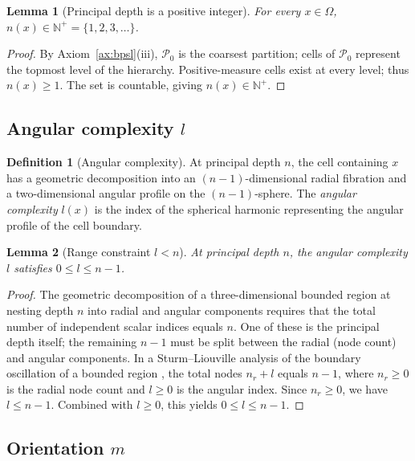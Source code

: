 \documentclass[11pt,twocolumn,a4paper]{article}
\theoremstyle{axiomstyle}
\theoremstyle{conseqstyle}
\newtheorem{lemma}{Lemma}
\theoremstyle{definition}
\newtheorem{definition}{Definition}
\theoremstyle{remark}
\newcommand{\Partition}{\mathcal{P}}
\newcommand{\Natural}{\mathbb{N}}
\begin{document}
\begin{lemma}[Principal depth is a positive integer]
\label{lem:nispositive}
For every $x\in\Omega$, $n(x)\in\Natural^{+}=\{1,2,3,\ldots\}$.
\end{lemma}
\begin{proof}
By Axiom~\ref{ax:bpsl}(iii), $\Partition_{0}$ is the coarsest partition; cells of $\Partition_{0}$ represent the topmost level of the hierarchy. Positive-measure cells exist at every level; thus $n(x)\ge 1$. The set is countable, giving $n(x)\in\Natural^{+}$.
\end{proof}

\subsection{Angular complexity $l$}

\begin{definition}[Angular complexity]
\label{def:angular}
At principal depth $n$, the cell containing $x$ has a geometric decomposition into an $(n-1)$-dimensional radial fibration and a two-dimensional angular profile on the $(n-1)$-sphere. The \emph{angular complexity} $l(x)$ is the index of the spherical harmonic representing the angular profile of the cell boundary.
\end{definition}

\begin{lemma}[Range constraint $l<n$]
\label{lem:langeconstraint}
At principal depth $n$, the angular complexity $l$ satisfies $0\le l\le n-1$.
\end{lemma}
\begin{proof}
The geometric decomposition of a three-dimensional bounded region at nesting depth $n$ into radial and angular components requires that the total number of independent scalar indices equals $n$. One of these is the principal depth itself; the remaining $n-1$ must be split between the radial (node count) and angular components. In a Sturm--Liouville analysis of the boundary oscillation of a bounded region \citep{arfkenweber2005}, the total nodes $n_{r}+l$ equals $n-1$, where $n_{r}\ge 0$ is the radial node count and $l\ge 0$ is the angular index. Since $n_{r}\ge 0$, we have $l\le n-1$. Combined with $l\ge 0$, this yields $0\le l\le n-1$.
\end{proof}

\subsection{Orientation $m$}
\end{document}
